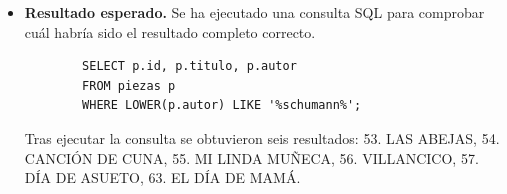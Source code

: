 \begin{itemize}
*   **53. LAS ABEJAS**
*   **54. CANCIÓN DE CUNA**
*   **55. MI LINDA MUÑECA**
*   **56. VILLANCICO**
*   **57. DÍA DE ASUETO**
*   **63. EL DÍA DE MAMÁ**
"
    \item \textbf{Resultado esperado.} Se ha ejecutado una consulta SQL para comprobar cuál habría sido el resultado completo correcto.
    \begin{verbatim}
        SELECT p.id, p.titulo, p.autor
        FROM piezas p
        WHERE LOWER(p.autor) LIKE '%schumann%';
    \end{verbatim}
    Tras ejecutar la consulta se obtuvieron seis resultados: 53. LAS ABEJAS, 54. CANCIÓN DE CUNA, 55. MI LINDA MUÑECA, 56. VILLANCICO, 57. DÍA DE ASUETO, 63. EL DÍA DE MAMÁ.


\end{itemize}

